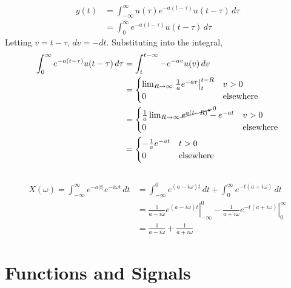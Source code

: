 \documentclass{article}
\begin{document}
\begin{align}
    y(t) &= \int_{-\infty}^\infty u(\tau) e^{-a (t - \tau)} u(t - \tau) \, d\tau \\
    &= \int_0^\infty e^{-a (t - \tau)} u(t - \tau) \, d\tau
\end{align}
Letting \(v = t - \tau\), \(dv = -dt\).
Substituting into the integral,
\begin{align}
    \int_0^\infty e^{-a (t - \tau)} u(t - \tau) \, d\tau &= \int_t^{t - \infty} -e^{-a v} u(v) \, dv \\
    &=
    \begin{cases}
        \lim_{R \to \infty} \left.\frac{1}{a} e^{-a v}\right|_t^{t - R} & v > 0 \\
        0 & \text{elsewhere}
    \end{cases} \\
    &=
    \begin{cases}
        \frac{1}{a} \lim_{R \to \infty} \cancelto{0}{e^{a (t - R)}} - e^{-a t} & v > 0 \\
        0 & \text{elsewhere}
    \end{cases} \\
    &=
    \begin{cases}
        -\frac{1}{a} e^{-a t} & t > 0 \\
        0 & \text{elsewhere}
    \end{cases}
\end{align}


\subsection{}

\begin{align}
    X(\omega) = \int_{-\infty}^\infty e^{-a |t|} e^{-i \omega t} \, dt
    &= \int_{-\infty}^0 e^{(a - i \omega) t} \, dt + \int_0^\infty e^{-t (a + i \omega)} \, dt \\
    &= \left.\frac{1}{a - i \omega} e^{(a - i \omega) t}\right|_{-\infty}^0 - \left.\frac{1}{a + i \omega} e^{-t (a + i \omega)}\right|_0^\infty \\
    &= \frac{1}{a - i \omega} + \frac{1}{a + i \omega}
\end{align}


\section{Functions and Signals}
\end{document}
